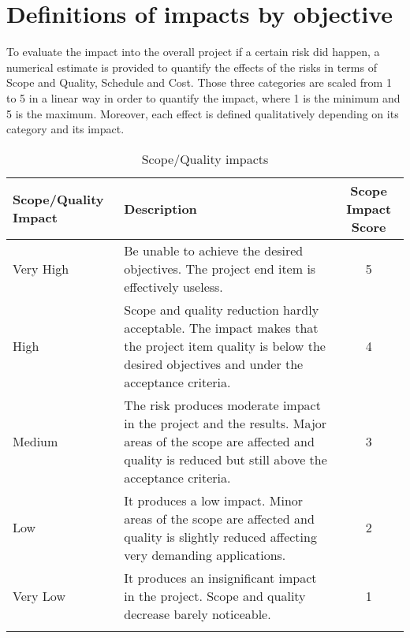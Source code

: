 \section{Definitions of impacts by objective}
\label{3.2}
To evaluate the impact into the overall project if a certain risk did happen, a numerical estimate is provided to quantify the effects of the risks in terms of Scope and Quality, Schedule and Cost. Those three categories are scaled from 1 to 5 in a linear way in order to quantify the impact, where 1 is the minimum and 5 is the maximum. Moreover, each effect is defined qualitatively depending on its category and its impact. 

\begin{longtable}[H]{l >{\raggedright\arraybackslash}p{6.3cm} c}
	
	\toprule[2pt]
	
	\textbf{Scope/Quality Impact} &  \textbf{Description}  & \textbf{Scope Impact Score} \\
	
	\midrule [1.5pt]
	\endhead
	
	Very High & Be unable to achieve the desired objectives. The project end item is effectively useless. & 5 
	\vspace{0.2cm} \\
	
	\midrule
	
	High & Scope and quality reduction hardly acceptable. The impact makes that the project item quality is below the desired objectives and under the acceptance criteria. & 4 
	\vspace{0.2cm} \\
	
	\midrule
	
	Medium & The risk produces moderate impact in the project and the results. Major areas of the scope are affected and quality is reduced but still above the acceptance criteria. & 3
	\vspace{0.2cm} \\

	\midrule

	Low & It produces a low impact. Minor areas of the scope are affected and quality is slightly reduced affecting very demanding applications. & 2
	\vspace{0.2cm} \\

	\midrule

	Very Low & It produces an insignificant impact in the project. Scope and quality decrease barely noticeable. & 1
	\vspace{0.2cm} \\
		
	\bottomrule[2pt]
	
	\caption{Scope/Quality impacts}

\end{longtable}




